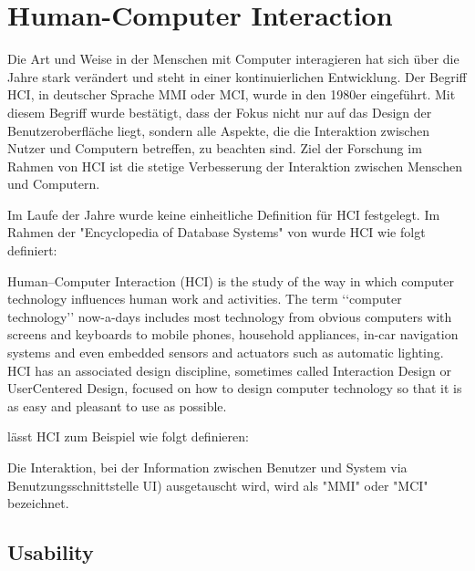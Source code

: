 \section{Human-Computer Interaction}\label{sec:ux}

Die Art und Weise in der Menschen mit Computer interagieren hat sich über die Jahre stark verändert und steht in einer kontinuierlichen Entwicklung. 
Der Begriff  \ac{HCI}, in deutscher Sprache \ac{MMI} oder \ac{MCI}, wurde in den 1980er eingeführt.
Mit diesem Begriff wurde bestätigt, dass der Fokus nicht nur auf das Design der Benutzeroberfläche liegt, sondern alle Aspekte, die die Interaktion zwischen Nutzer und Computern betreffen, zu beachten sind. \citep[vgl.]{preece_human-computer_1995}
Ziel der Forschung im Rahmen von \ac{HCI} ist die stetige Verbesserung der Interaktion zwischen Menschen und Computern. \newline

\noindent Im Laufe der Jahre wurde keine einheitliche Definition für \ac{HCI} festgelegt.
Im Rahmen der "Encyclopedia of Database Systems" von \citet{dix_human-computer_2009} wurde \ac{HCI} wie folgt definiert:
\begin{definition}
  Human–Computer Interaction (HCI) is the study of the way in which computer technology influences human work and activities. 
  The term ‘‘computer technology’’ now-a-days includes most technology from obvious computers with screens and keyboards to mobile phones, household appliances, in-car navigation
  systems and even embedded sensors and actuators such as automatic lighting. 
  HCI has an associated design discipline, sometimes called Interaction Design or UserCentered Design, focused on how to design computer technology so that it is as easy and
  pleasant to use as possible.
\end{definition}

\noindent \citet{heimgartner_interkulturelles_2017} lässt \ac{HCI} zum Beispiel wie folgt definieren:

\begin{definition}
  Die Interaktion, bei der Information zwischen Benutzer und System via Benutzungsschnittstelle \ac{UI}) ausgetauscht wird, wird als "\ac{MMI}"  oder  "\ac{MCI}" bezeichnet.
\end{definition}

\subsection{Usability}

